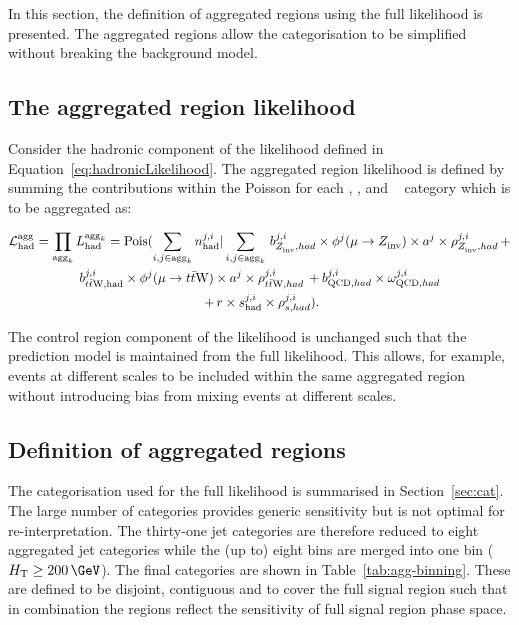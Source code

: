 In this section, the definition of aggregated regions 
using the full likelihood is presented. The aggregated regions allow the categorisation to be 
simplified without breaking the background model. 

\subsection{The aggregated region likelihood}

Consider the hadronic component of the likelihood defined in Equation~\ref{eq:hadronicLikelihood}.
The aggregated region likelihood is defined by summing the contributions within the Poisson for
each \mht, \scalht, \nb and \njet~ category which is to be aggregated as:

\begin{multline}
\label{eq:aggregatedLikelihood}
\mathcal{L}^{\text{agg}}_{\mathrm{had}} = \prod_{\text{agg}_{k}} {L}^{\text{agg}_{k}}_{\mathrm{had}} = \mathrm{Pois}(\sum_{i,j\in\text{agg}_{k}} n^{j,i}_{\mathrm{had}} |\sum_{i,j\in\text{agg}_{k}}\, b^{j,i}_{Z_{\rm inv}^{~},had}\times\phi^{j}(\mu\rightarrow Z_{\rm inv}^{~})\times a^{j}\times\rho^{j,i}_{Z_{\rm inv}^{~},had}\, + \\ 
b^{j,i}_{t\bar{t}\text{W},\mathrm{had}}\times\phi^{j}(\mu\rightarrow t\bar{t}\text{W})\times a^{j}\times\rho^{j,i}_{t\bar{t}\text{W},had}\, + b^{j,i}_{\text{QCD},had}\times\omega^{j,i}_{\text{QCD},had}\\\
+ \,r\times s^{j,i}_{\mathrm{had}}\times\rho^{j,i}_{s,had}).
\end{multline}

The control region component of the likelihood is unchanged such that the prediction model
is maintained from the full likelihood. This allows, for example, events 
at different scales to be included within the same aggregated region without introducing
bias from mixing events at different scales.

\subsection{Definition of aggregated regions}
\label{sec:ssr-alphat}
The categorisation used for the full likelihood is summarised in Section~\ref{sec:cat}. 
The large number of categories provides generic sensitivity but is not optimal for re-interpretation. 
The thirty-one jet categories are therefore reduced to eight aggregated jet categories while
the (up to) eight \scalht bins are merged into one bin ($\scalht \geq 200\,\GeV$).
The final categories are shown in Table~\ref{tab:agg-binning}.
These are defined to be disjoint, contiguous and to cover the full
signal region such that in combination the regions reflect the sensitivity of
full signal region phase space.


